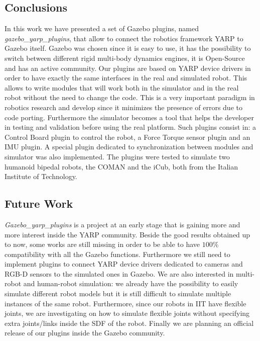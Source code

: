 \subsection{Conclusions}\label{conclusions4}
In this work we have presented a set of Gazebo plugins, named \emph{gazebo\_yarp\_plugins}, that allow to connect the robotics framework YARP to Gazebo itself. Gazebo was chosen since it is easy to use, it has the possibility to switch between different rigid multi-body dynamics engines, it is Open-Source and has an active community. Our plugins are based on YARP device drivers in order to have exactly the same interfaces in the real and simulated robot. This allows to write modules that will work both in the simulator and in the real robot without the need to change the code. This is a very important paradigm in robotics research and develop since it minimizes the presence of errors due to code porting. Furthermore the simulator becomes a tool that helps the developer in testing and validation before using the real platform.
Such plugins consist in: a Control Board plugin to control the robot, a Force Torque sensor plugin and an IMU plugin. A special plugin dedicated to synchronization between modules and simulator was also implemented. The plugins were tested to simulate two humanoid bipedal robots, the COMAN and the iCub, both from the Italian Institute of Technology.


\subsection{Future Work}\label{future_works4}
\emph{Gazebo\_yarp\_plugins} is a project at an early stage that is gaining more and more interest inside the YARP community. Beside the good results obtained up to now, some works are still missing in order to be able to have $100\%$ compatibility with all the Gazebo functions. Furthermore we still need to implement plugins to connect YARP device drivers dedicated to cameras and RGB-D sensors to the simulated ones in Gazebo. We are also interested in multi-robot and human-robot simulation: we already have the possibility to easily simulate different robot models but it is still difficult to simulate multiple instances of the same robot. Furthermore, since our robots in IIT have flexible joints, we are investigating on how to simulate flexible joints without specifying extra joints/links inside the SDF of the robot. 
Finally we are planning an official release of our plugins inside the Gazebo community.





